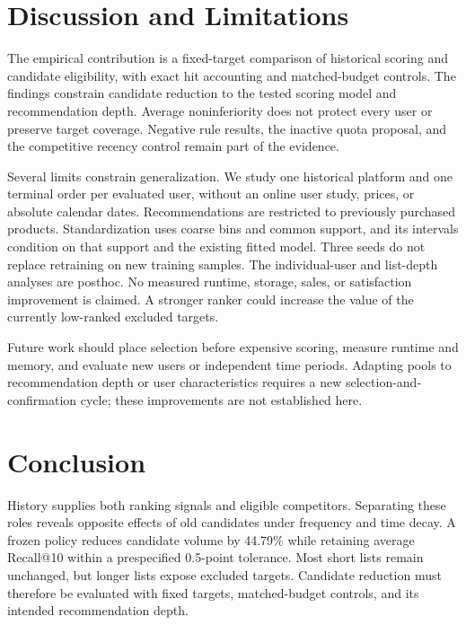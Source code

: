 \section{Discussion and Limitations}
\label{sec:discussion}

The empirical contribution is a fixed-target comparison of historical scoring and candidate eligibility, with exact hit accounting and matched-budget controls. The findings constrain candidate reduction to the tested scoring model and recommendation depth. Average noninferiority does not protect every user or preserve target coverage. Negative rule results, the inactive quota proposal, and the competitive recency control remain part of the evidence.

Several limits constrain generalization. We study one historical platform and one terminal order per evaluated user, without an online user study, prices, or absolute calendar dates. Recommendations are restricted to previously purchased products. Standardization uses coarse bins and common support, and its intervals condition on that support and the existing fitted model. Three seeds do not replace retraining on new training samples. The individual-user and list-depth analyses are posthoc. No measured runtime, storage, sales, or satisfaction improvement is claimed. A stronger ranker could increase the value of the currently low-ranked excluded targets.

Future work should place selection before expensive scoring, measure runtime and memory, and evaluate new users or independent time periods. Adapting pools to recommendation depth or user characteristics requires a new selection-and-confirmation cycle; these improvements are not established here.

\section{Conclusion}
History supplies both ranking signals and eligible competitors. Separating these roles reveals opposite effects of old candidates under frequency and time decay. A frozen policy reduces candidate volume by 44.79\% while retaining average Recall@10 within a prespecified 0.5-point tolerance. Most short lists remain unchanged, but longer lists expose excluded targets. Candidate reduction must therefore be evaluated with fixed targets, matched-budget controls, and its intended recommendation depth.


